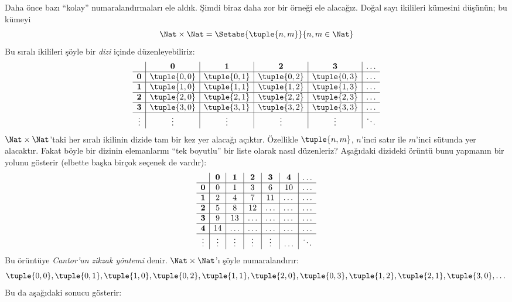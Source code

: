 



\begin{explain}
Daha önce bazı ``kolay'' numaralandırmaları ele aldık. Şimdi biraz daha zor
bir örneği ele alacağız. Doğal sayı ikilileri kümesini düşünün; bu kümeyi
\[
\Nat \times \Nat = \Setabs{\tuple{n,m}}{n,m \in \Nat}
\]
Bu sıralı ikilileri şöyle bir \emph{dizi} içinde düzenleyebiliriz:
\[
\begin{array}{ c | c | c | c | c | c}
& \mathbf 0 & \mathbf 1 & \mathbf 2 & \mathbf 3 & \dots \\
\hline
\mathbf 0 & \tuple{0,0} & \tuple{0,1} & \tuple{0,2} & \tuple{0,3} & \dots \\
\hline
\mathbf 1 & \tuple{1,0} & \tuple{1,1} & \tuple{1,2} & \tuple{1,3} & \dots \\
\hline
\mathbf 2 & \tuple{2,0} & \tuple{2,1} & \tuple{2,2} & \tuple{2,3} & \dots \\
\hline
\mathbf 3 & \tuple{3,0} & \tuple{3,1} & \tuple{3,2} & \tuple{3,3} & \dots \\
\hline
\vdots & \vdots & \vdots & \vdots & \vdots & \ddots\\
\end{array}
\]
$\Nat \times \Nat$'taki her sıralı ikilinin dizide tam bir kez yer alacağı
açıktır. Özellikle $\tuple{n,m}$, $n$'inci satır ile $m$'inci sütunda yer
alacaktır. Fakat böyle bir dizinin elemanlarını ``tek boyutlu'' bir liste
olarak nasıl düzenleriz? Aşağıdaki dizideki örüntü bunu yapmanın bir yolunu
gösterir (elbette başka birçok seçenek de vardır):
\[
\begin{array}{ c | c | c | c | c | c | c}
& \mathbf 0 & \mathbf 1 & \mathbf 2 & \mathbf 3 & \mathbf 4 &\dots \\
\hline
\mathbf 0 & 0  & 1& 3 & 6& 10 &\ldots \\
\hline
\mathbf 1 &2 & 4& 7 & 11 & \dots &\ldots \\
\hline
\mathbf 2 & 5 & 8 & 12 & \ldots & \dots&\ldots \\
\hline
\mathbf 3 & 9 & 13 & \ldots & \ldots & \dots & \ldots \\
\hline
\mathbf 4 & 14 & \ldots & \ldots & \ldots & \dots & \ldots \\
\hline
\vdots & \vdots & \vdots & \vdots & \vdots&\ldots & \ddots\\
\end{array}
\]\noindent
Bu örüntüye \emph{Cantor'un zikzak yöntemi} denir. $\Nat \times \Nat$'ı
şöyle numaralandırır:
\[
\tuple{0,0}, \tuple{0,1}, \tuple{1,0}, \tuple{0,2}, \tuple{1,1},
\tuple{2,0}, \tuple{0,3}, \tuple{1,2}, \tuple{2,1}, \tuple{3,0}, \dots
\]
Bu da aşağıdaki sonucu gösterir:
\end{explain}

